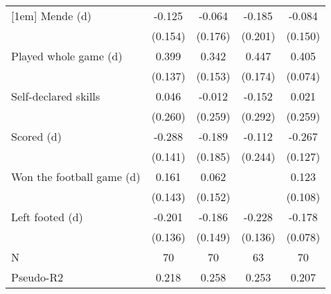 {\begin{tabular}{l*{4}{c}}
[1em]
Mende (d)           &      -0.125         &      -0.064         &      -0.185         &      -0.084         \\
                    &     (0.154)         &     (0.176)         &     (0.201)         &     (0.150)         \\
[1em]
Played whole game (d)&       0.399\sym{***}&       0.342\sym{**} &       0.447\sym{**} &       0.405\sym{***}\\
                    &     (0.137)         &     (0.153)         &     (0.174)         &     (0.074)         \\
[1em]
Self-declared skills&       0.046         &      -0.012         &      -0.152         &       0.021         \\
                    &     (0.260)         &     (0.259)         &     (0.292)         &     (0.259)         \\
[1em]
Scored (d)          &      -0.288\sym{**} &      -0.189         &      -0.112         &      -0.267\sym{**} \\
                    &     (0.141)         &     (0.185)         &     (0.244)         &     (0.127)         \\
[1em]
Won the football game (d)&       0.161         &       0.062         &                     &       0.123         \\
                    &     (0.143)         &     (0.152)         &                     &     (0.108)         \\
[1em]
Left footed (d)     &      -0.201         &      -0.186         &      -0.228\sym{*}  &      -0.178\sym{**} \\
                    &     (0.136)         &     (0.149)         &     (0.136)         &     (0.078)         \\
\hline
N                   &          70         &          70         &          63         &          70         \\
Pseudo-R2                  &       0.218         &       0.258         &       0.253         &       0.207         \\
\hline\hline
\end{tabular}
}
